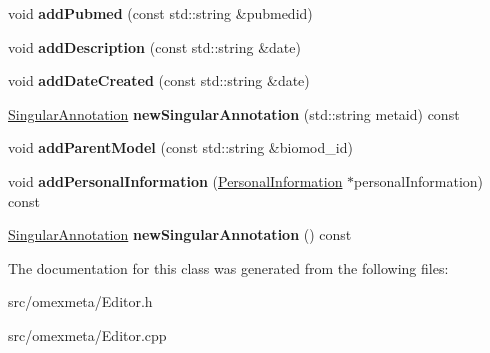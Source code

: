\begin{DoxyCompactItemize}
void {\bfseries add\+Pubmed} (const std\+::string \&pubmedid)
\item 
\mbox{\label{classomexmeta_1_1Editor_a8526a87544b1265695f1749100da5fa2}} 
void {\bfseries add\+Description} (const std\+::string \&date)
\item 
\mbox{\label{classomexmeta_1_1Editor_ae1b146f142ec10237f8edbecf0368f8e}} 
void {\bfseries add\+Date\+Created} (const std\+::string \&date)
\item 
\mbox{\label{classomexmeta_1_1Editor_a50674b2591d2fed572954ac8490ee21c}} 
\hyperlink{classomexmeta_1_1Triple}{Singular\+Annotation} {\bfseries new\+Singular\+Annotation} (std\+::string metaid) const
\item 
\mbox{\label{classomexmeta_1_1Editor_ad7240613a1f3e215af6e4a05d121508c}} 
void {\bfseries add\+Parent\+Model} (const std\+::string \&biomod\+\_\+id)
\item 
\mbox{\label{classomexmeta_1_1Editor_ae97ebb9bb2bc3ebd7d3b0a5eca9dfb0f}} 
void {\bfseries add\+Personal\+Information} (\hyperlink{classomexmeta_1_1PersonalInformation}{Personal\+Information} $\ast$personal\+Information) const
\item 
\mbox{\label{classomexmeta_1_1Editor_a6142da2b89068e9638410c3c903e3b64}} 
\hyperlink{classomexmeta_1_1Triple}{Singular\+Annotation} {\bfseries new\+Singular\+Annotation} () const
\end{DoxyCompactItemize}


The documentation for this class was generated from the following files\+:\begin{DoxyCompactItemize}
\item 
src/omexmeta/Editor.\+h\item 
src/omexmeta/Editor.\+cpp\end{DoxyCompactItemize}
